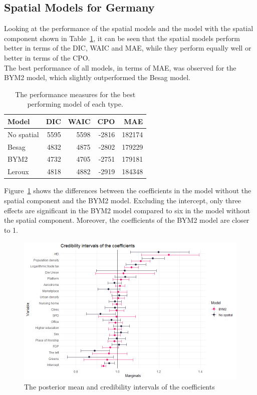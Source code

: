\subsection{Spatial Models for Germany}
Looking at the performance of the spatial models and the model with the spatial component shown in Table~\ref{allGermany}, it can be seen that the spatial models perform better in terms of the DIC, WAIC and MAE, while they perform equally well or better in terms of the CPO. \\
The best performance of all models, in terms of MAE, was observed for the BYM2 model, which slightly outperformed the Besag model.
\begin{table}[H] 
\caption{The performance measures for the best performing model of each type. \label{allGermany}}
\begin{tabular}{l r r r r}
\toprule
\textbf{Model}	& \textbf{DIC}	& \textbf{WAIC} & \textbf{CPO} & \textbf{MAE}\\
\midrule
No spatial & 5595 & 5598 & -2816 & 182174 \\
Besag& 4832 & 4875 & -2802 & 179229\\
BYM2 & 4732 & 4705 & -2751 & 179181\\
Leroux & 4818 & 4882 & -2919 & 184348 \\
\bottomrule
\end{tabular}
\end{table}
Figure~\ref{intervalGermany} shows the differences between the coefficients in the model without the spatial component and the BYM2 model. Excluding the intercept, only three effects are significant in the BYM2 model compared to six in the model without the spatial component. Moreover, the coefficients of the BYM2 model are closer to 1. 
\begin{figure}[H]
  \centering
  \includegraphics[width = \textwidth]{intervals_germany.png}
  \caption{The posterior mean and credibility intervals of the coefficients}
  \label{intervalGermany}
\end{figure}
